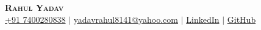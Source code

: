 
\begin{center}
    \textbf{\Huge \scshape Rahul Yadav} \\ \vspace{3pt}
    \small
    \faMobile \hspace{.5pt} \href{tel:917400280838}{+91 7400280838}
    $|$
    \faAt \hspace{.5pt} \href{mailto:yadavrahul8141@yahoo.com}{yadavrahul8141@yahoo.com}
    $|$
    \faLinkedinSquare \hspace{.5pt} \href{https://www.linkedin.com/in/yadavrahul8141}{LinkedIn}
    $|$
    \faGithub \hspace{.5pt} \href{https://github.com/rahul007-biy}{GitHub}
\end{center}
